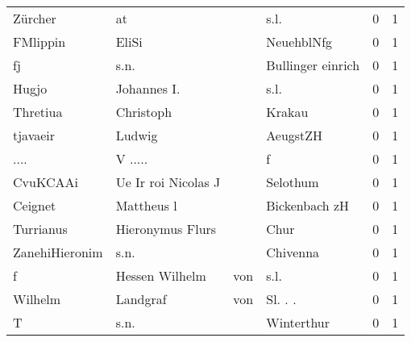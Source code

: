 \begin{tabular}{llllrr}
                  Zürcher &                                 at &             &                                        s.l. &          0 &         1 \\
                 FMlippin &                              EliSi &             &                                  NeuehblNfg &          0 &         1 \\
                       fj &                               s.n. &             &                           Bullinger einrich &          0 &         1 \\
                    Hugjo &                        Johannes I. &             &                                        s.l. &          0 &         1 \\
                 Thretiua &                          Christoph &             &                                      Krakau &          0 &         1 \\
                 tjavaeir &                             Ludwig &             &                                    AeugstZH &          0 &         1 \\
                     .... &                            V ..... &             &                                           f &          0 &         1 \\
                 CvuKCAAi &                Ue Ir roi Nicolas J &             &                                    Selothum &          0 &         1 \\
                  Ceignet &                         Mattheus l &             &                               Bickenbach zH &          0 &         1 \\
                Turrianus &                   Hieronymus Flurs &             &                                        Chur &          0 &         1 \\
           ZanehiHieronim &                               s.n. &             &                                    Chivenna &          0 &         1 \\
                        f &                     Hessen Wilhelm &         von &                                        s.l. &          0 &         1 \\
                  Wilhelm &                           Landgraf &         von &                                    Sl. . .  &          0 &         1 \\
                        T &                               s.n. &             &                                  Winterthur &          0 &         1 \\

\end{tabular}
